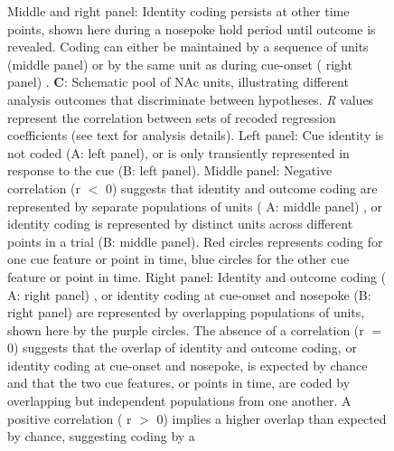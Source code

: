 \documentclass[11pt]{article}
\newcommand{\bsf}[1]{\textbf{#1}}
\providecommand{\DIFadd}[1]{{\protect\color{red} \sf #1}} %
\providecommand{\DIFdel}[1]{} %
\providecommand{\DIFaddFL}[1]{\DIFadd{#1}} %
\providecommand{\DIFdelFL}[1]{\DIFdel{#1}} %
\providecommand{\DIFaddbeginFL}{} %
\providecommand{\DIFaddendFL}{} %
\providecommand{\DIFdelbeginFL}{} %
\providecommand{\DIFdelendFL}{} %
\newcommand{\DIFscaledelfig}{0.5}
\newlength{\DIFdelgraphicswidth} %
\newlength{\DIFdelgraphicsheight} %
\newcommand{\DIFaddincludegraphics}[2][]{{\color{red}\fbox{\DIFOincludegraphics[#1]{#2}}}} %
\newcommand{\DIFdelincludegraphics}[2][]{%
\sbox{\DIFdelgraphicsbox}{\DIFOincludegraphics[#1]{#2}}%
\settoboxwidth{\DIFdelgraphicswidth}{\DIFdelgraphicsbox} %
\settoboxtotalheight{\DIFdelgraphicsheight}{\DIFdelgraphicsbox} %
\scalebox{\DIFscaledelfig}{%
\parbox[b]{\DIFdelgraphicswidth}{\usebox{\DIFdelgraphicsbox}\\[-\baselineskip] \rule{\DIFdelgraphicswidth}{0em}}\llap{\resizebox{\DIFdelgraphicswidth}{\DIFdelgraphicsheight}{%
\setlength{\unitlength}{\DIFdelgraphicswidth}%
\begin{picture}(1,1)%
\thicklines\linethickness{2pt} %
{\color[rgb]{1,0,0}\put(0,0){\framebox(1,1){}}}%
{\color[rgb]{1,0,0}\put(0,0){\line( 1,1){1}}}%
{\color[rgb]{1,0,0}\put(0,1){\line(1,-1){1}}}%
\end{picture}%
}\hspace*{3pt}}} %
} %
\DeclareRobustCommand{\DIFaddbeginFL}{\DIFOaddbeginFL \let\includegraphics\DIFaddincludegraphics} %
\DeclareRobustCommand{\DIFaddendFL}{\DIFOaddendFL \let\includegraphics\DIFOincludegraphics} %
\DeclareRobustCommand{\DIFdelbeginFL}{\DIFOdelbeginFL \let\includegraphics\DIFdelincludegraphics} %
\DeclareRobustCommand{\DIFdelendFL}{\DIFOaddendFL \let\includegraphics\DIFOincludegraphics} %
\begin{document}
\begin{figure}[ht!]
{{  }\DIFdelendFL \DIFaddbeginFL \DIFaddFL{Middle and right }\DIFaddendFL panel\DIFdelbeginFL \DIFdelFL{)}\DIFdelendFL : \DIFdelbeginFL \DIFdelFL{Coding of cue identity }\DIFdelendFL \DIFaddbeginFL \DIFaddFL{Identity coding }\DIFaddendFL persists \DIFaddbeginFL \DIFaddFL{at other time points, shown here }\DIFaddendFL during a nosepoke hold period until outcome is revealed. Coding can either be maintained by \DIFaddbeginFL \DIFaddFL{a sequence of units (middle panel) or by }\DIFaddendFL the same unit as during cue-onset (\DIFdelbeginFL \DIFdelFL{H2A}\DIFdelendFL \DIFaddbeginFL \DIFaddFL{right panel}\DIFaddendFL )\DIFaddbeginFL \DIFaddFL{. \bsf{C}: Schematic pool of NAc units, illustrating different analysis outcomes that discriminate between hypotheses. }{\it \DIFaddFL{R}} \DIFaddFL{values represent the correlation between sets of recoded regression coefficients (see text for analysis details). Left panel: Cue identity is not coded (A: left panel), }\DIFaddendFL or \DIFaddbeginFL \DIFaddFL{is only transiently represented in response to the cue (B: left panel). Middle panel: Negative correlation (r $<$ 0) suggests that identity and outcome coding are represented }\DIFaddendFL by \DIFdelbeginFL \DIFdelFL{a sequence }\DIFdelendFL \DIFaddbeginFL \DIFaddFL{separate populations }\DIFaddendFL of units (\DIFdelbeginFL \DIFdelFL{H2B}\DIFdelendFL \DIFaddbeginFL \DIFaddFL{A: middle panel}\DIFaddendFL )\DIFaddbeginFL \DIFaddFL{, or identity coding is represented by distinct units across different points in a trial (B: middle panel)}\DIFaddendFL . \DIFdelbeginFL \DIFdelFL{H3 }\DIFdelendFL \DIFaddbeginFL \DIFaddFL{Red circles represents coding for one cue feature or point in time, blue circles for the other cue feature or point in time. Right panel: Identity and outcome coding }\DIFaddendFL (\DIFaddbeginFL \DIFaddFL{A: }\DIFaddendFL right panel)\DIFaddbeginFL \DIFaddFL{, or identity coding at cue-onset and nosepoke (B}\DIFaddendFL : \DIFdelbeginFL \DIFdelFL{Coding }\DIFdelendFL \DIFaddbeginFL \DIFaddFL{right panel) are represented by overlapping populations }\DIFaddendFL of \DIFdelbeginFL \DIFdelFL{cue identity persists after }\DIFdelendFL \DIFaddbeginFL \DIFaddFL{units, shown here by }\DIFaddendFL the \DIFaddbeginFL \DIFaddFL{purple circles. The absence of a correlation (r $=$ 0) suggests that the overlap of identity and }\DIFaddendFL outcome \DIFaddbeginFL \DIFaddFL{coding, or identity coding at cue-onset and nosepoke, }\DIFaddendFL is \DIFdelbeginFL \DIFdelFL{received when }\DIFdelendFL \DIFaddbeginFL \DIFaddFL{expected by chance and that }\DIFaddendFL the \DIFdelbeginFL \DIFdelFL{rat gets feedback about his decision}\DIFdelendFL \DIFaddbeginFL \DIFaddFL{two cue features}\DIFaddendFL , \DIFaddbeginFL \DIFaddFL{or points in time, are coded }\DIFaddendFL by \DIFdelbeginFL \DIFdelFL{either the same unit as during cue-onset }\DIFdelendFL \DIFaddbeginFL \DIFaddFL{overlapping but independent populations from one another. A positive correlation }\DIFaddendFL (\DIFdelbeginFL \DIFdelFL{H3A}\DIFdelendFL \DIFaddbeginFL \DIFaddFL{r $>$ 0}\DIFaddendFL ) \DIFdelbeginFL \DIFdelFL{or }\DIFdelendFL \DIFaddbeginFL \DIFaddFL{implies a higher overlap than expected }\DIFaddendFL by \DIFaddbeginFL \DIFaddFL{chance, suggesting coding by }\DIFaddendFL a \DIFdelbeginFL \DIFdelFL{sequence of }}
\end{figure}
\end{document}
